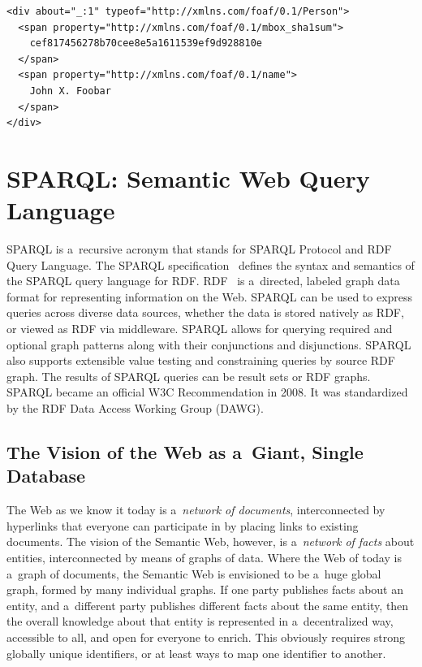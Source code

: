 \begin{lstlisting}[caption={A~sample graph in RDFa syntax.},
  label={code:rdfa-syntax}]
<div about="_:1" typeof="http://xmlns.com/foaf/0.1/Person">           
  <span property="http://xmlns.com/foaf/0.1/mbox_sha1sum">
    cef817456278b70cee8e5a1611539ef9d928810e
  </span> 
  <span property="http://xmlns.com/foaf/0.1/name">
    John X. Foobar
  </span>
</div> 
\end{lstlisting}

\section{SPARQL: Semantic Web Query Language}

SPARQL is a~recursive acronym that stands for
SPARQL Protocol and RDF Query Language.
The SPARQL specification~\cite{prudhommeaux2008sparql}
defines the syntax and semantics
of the SPARQL query language for RDF.
RDF~\cite{klyne2004rdf} is a~directed, labeled
graph data format for representing information on the Web.
SPARQL can be used to express queries
across diverse data sources,
whether the data is stored natively as RDF,
or viewed as RDF via middleware.
SPARQL allows for querying required
and optional graph patterns
along with their conjunctions and disjunctions.
SPARQL also supports extensible value testing
and constraining queries by source RDF graph.
The results of SPARQL queries can be result sets or RDF graphs.
SPARQL became an official W3C Recommendation in 2008.
It was standardized by the RDF Data Access Working Group (DAWG).

\subsection{The Vision of the Web as a~Giant, Single Database}

The Web as we know it today is a~\emph{network of documents},
interconnected by hyperlinks that everyone can participate in
by placing links to existing documents.
The vision of the Semantic Web, however,
is a~\emph{network of facts} about entities,
interconnected by means of graphs of data.
Where the Web of today is a~graph of documents,
the Semantic Web is envisioned to be a~huge global graph,
formed by many individual graphs.
If one party publishes facts about an entity,
and a~different party publishes different facts
about the same entity,
then the overall knowledge about that entity
is represented in a~decentralized way,
accessible to all, and open for everyone to enrich.
This obviously requires strong globally unique identifiers,
or at least ways to map one identifier to another.


